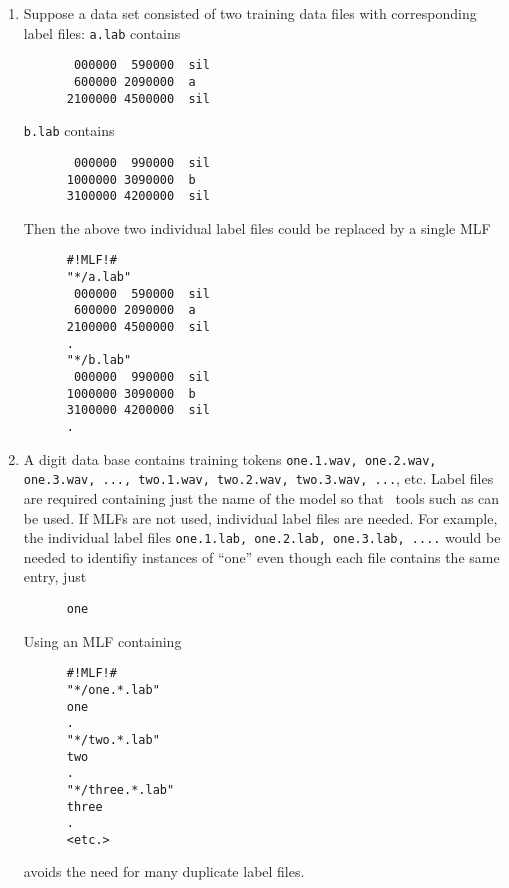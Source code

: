 \begin{enumerate}
\item
Suppose a data set consisted of two training data files with
corresponding label files:
\newline
\texttt{a.lab} contains 
\begin{verbatim}
       000000  590000  sil
       600000 2090000  a
      2100000 4500000  sil
\end{verbatim}
\texttt{b.lab} contains 
\begin{verbatim}
       000000  990000  sil
      1000000 3090000  b
      3100000 4200000  sil
\end{verbatim}
Then the above two individual label files could be replaced by a single MLF
\begin{verbatim}
      #!MLF!#
      "*/a.lab"
       000000  590000  sil
       600000 2090000  a
      2100000 4500000  sil
      .                      
      "*/b.lab"
       000000  990000  sil
      1000000 3090000  b
      3100000 4200000  sil
      .                      
\end{verbatim}

\item
A digit data base contains training tokens \texttt{one.1.wav, one.2.wav, one.3.wav, ...,
two.1.wav, two.2.wav, two.3.wav, ...}, etc.  Label files are required containing
just the name of the model so that \HTK\ tools such as  can be used.
If MLFs are not used, individual label files are needed.  For example,
the individual label files \texttt{one.1.lab, one.2.lab, one.3.lab, ....} would be
needed
to identifiy instances of ``one'' even though each file contains the same entry, just
\begin{verbatim}
      one
\end{verbatim}
Using an MLF containing
\begin{verbatim}
      #!MLF!#
      "*/one.*.lab"
      one
      .
      "*/two.*.lab"
      two
      .
      "*/three.*.lab"
      three
      .
      <etc.>
\end{verbatim}
avoids the need for many duplicate label files.


\end{enumerate}
